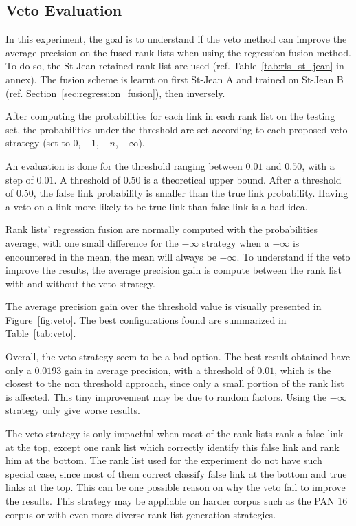 \subsection{Veto Evaluation}

In this experiment, the goal is to understand if the veto method can improve the average precision on the fused rank lists when using the regression fusion method.
To do so, the St-Jean retained rank list are used (ref. Table~\ref{tab:rls_st_jean} in annex).
The fusion scheme is learnt on first St-Jean A and trained on St-Jean B (ref. Section~\ref{sec:regression_fusion}), then inversely.

After computing the probabilities for each link in each rank list on the testing set, the probabilities under the threshold are set according to each proposed veto strategy (set to $0$, $-1$, $-n$, $-\infty$).

An evaluation is done for the threshold ranging between $0.01$ and $0.50$, with a step of $0.01$.
A threshold of $0.50$ is a theoretical upper bound.
After a threshold of $0.50$, the false link probability is smaller than the true link probability.
Having a veto on a link more likely to be true link than false link is a bad idea.

Rank lists' regression fusion are normally computed with the probabilities average, with one small difference for the $-\infty$ strategy when a $-\infty$ is encountered in the mean, the mean will always be $-\infty$.
To understand if the veto improve the results, the average precision gain is compute between the rank list with and without the veto strategy.

The average precision gain over the threshold value is visually presented in Figure~\ref{fig:veto}.
The best configurations found are summarized in Table~\ref{tab:veto}.

Overall, the veto strategy seem to be a bad option.
The best result obtained have only a $0.0193$ gain in average precision, with a threshold of $0.01$, which is the closest to the non threshold approach, since only a small portion of the rank list is affected.
This tiny improvement may be due to random factors.
Using the $-\infty$ strategy only give worse results.

The veto strategy is only impactful when most of the rank lists rank a false link at the top, except one rank list which correctly identify this false link and rank him at the bottom.
The rank list used for the experiment do not have such special case, since most of them correct classify false link at the bottom and true links at the top.
This can be one possible reason on why the veto fail to improve the results.
This strategy may be appliable on harder corpus such as the PAN 16 corpus or with even more diverse rank list generation strategies.

